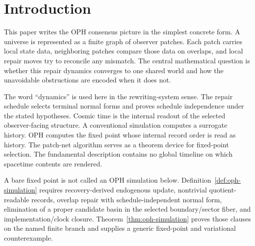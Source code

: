 \documentclass[11pt]{article}
\theoremstyle{remark}
\theoremstyle{plain}
\begin{document}
\section{Introduction}

This paper writes the OPH consensus picture in the simplest concrete form. A universe is represented as a finite graph of observer patches. Each patch carries local state data, neighboring patches compare those data on overlaps, and local repair moves try to reconcile any mismatch. The central mathematical question is whether this repair dynamics converges to one shared world and how the unavoidable obstructions are encoded when it does not.

The word ``dynamics'' is used here in the rewriting-system sense. The repair schedule selects
terminal normal forms and proves schedule independence under the stated hypotheses. Cosmic time is
the internal readout of the selected observer-facing structure. A conventional simulation computes
a surrogate history. OPH computes the fixed point whose internal record order is read as history.
The patch-net algorithm serves as a theorem device for fixed-point selection. The fundamental
description contains no global timeline on which spacetime contents are rendered.

A bare fixed point is not called an OPH simulation below.
Definition~\ref{def:oph-simulation} requires recovery-derived endogenous update,
nontrivial quotient-readable records, overlap repair with schedule-independent normal form,
elimination of a proper candidate basin in the selected boundary/sector fiber, and
implementation/clock closure. Theorem~\ref{thm:oph-simulation} proves those clauses on the
named finite branch and supplies a generic fixed-point and variational counterexample.
\end{document}
